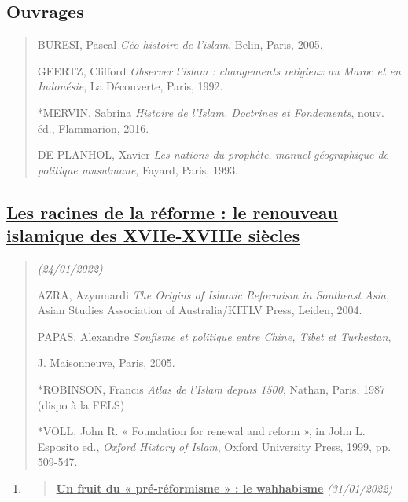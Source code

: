\hypertarget{ouvrages}{%
\subsection{Ouvrages}\label{ouvrages}}

\begin{quote}
BURESI, Pascal \emph{Géo-histoire de l'islam}, Belin, Paris, 2005.

GEERTZ, Clifford \emph{Observer l'islam : changements religieux au Maroc
et en Indonésie}, La Découverte, Paris, 1992.

*MERVIN, Sabrina \emph{Histoire de l'Islam. Doctrines et Fondements},
nouv. éd., Flammarion, 2016.

DE PLANHOL, Xavier \emph{Les nations du prophète}, \emph{manuel
géographique de politique musulmane}, Fayard, Paris, 1993.
\end{quote}

\hypertarget{les-racines-de-la-ruxe9forme-le-renouveau-islamique-des-xviie-xviiie-siuxe8cles}{%
\subsection{\texorpdfstring{\underline{Les racines de la réforme : le
renouveau islamique des XVIIe-XVIIIe
siècles}}{Les racines de la réforme : le renouveau islamique des XVIIe-XVIIIe siècles}}\label{les-racines-de-la-ruxe9forme-le-renouveau-islamique-des-xviie-xviiie-siuxe8cles}}

\begin{quote}
\emph{(24/01/2022)}

AZRA, Azyumardi \emph{The Origins of Islamic Reformism in Southeast
Asia}, Asian Studies Association of Australia/KITLV Press, Leiden, 2004.

PAPAS, Alexandre \emph{Soufisme et politique entre Chine, Tibet et
Turkestan},

J. Maisonneuve, Paris, 2005.

*ROBINSON, Francis \emph{Atlas de l'Islam depuis 1500}, Nathan, Paris,
1987 (dispo à la FELS)

*VOLL, John R. « Foundation for renewal and reform », in John L.
Esposito ed., \emph{Oxford History of Islam}, Oxford University Press,
1999, pp. 509-547.
\end{quote}

\begin{enumerate}
\def\labelenumi{\arabic{enumi}.}
\setcounter{enumi}{2}
\item
  \begin{quote}
  \textbf{\underline{Un fruit du « pré-réformisme » : le wahhabisme}}
  \emph{(31/01/2022)}
  \end{quote}
\end{enumerate}

